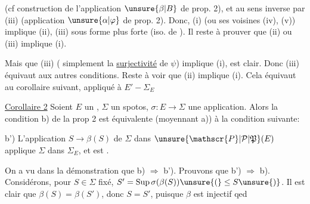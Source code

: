 
(cf construction de l'application $\unsure{\beta|B}$ de prop. 2), et au sens inverse par (iii) (application $\unsure{\alpha|\varphi}$ de prop. 2). Donc, (i) (ou ses voisines (iv), (v)) implique (ii), (iii) sous forme plus forte (iso. de ). Il reste à prouver que (ii) ou (iii) implique  (i).

Mais que (iii) ( simplement la \uline{surjectivité} de $\psi$) implique (i), est clair. Donc (iii) équivaut aux autres conditions. Reste à voir que (ii) implique (i). Cela équivaut au corollaire suivant, appliqué à $E'\mathbin{-}\Sigma_E$

\uline{Corollaire 2} Soient $E$ un , $\Sigma$ un spotos, $\sigma:E\longrightarrow\Sigma$ une application. Alors la condition b) de la prop 2 est équivalente (moyennant a)) à la condition suivante:

b') L'application $S\longrightarrow\beta(S)$ de $\Sigma$ dans $\unsure{\mathscr{P}|\mathcal{P}|\mathfrak{P}}(E)$ applique $\Sigma$ dans $\Sigma_E$, et est .

On a vu dans la démonstration que b) $\Longrightarrow$ b'). Prouvons que b') $\Longrightarrow$ b). Considérons, pour $S\in\Sigma$ fixé, $S'=\operatorname{Sup}\sigma(\beta(S))\unsure{(}\leq S\unsure{)}$. Il est clair que $\beta(S)=\beta(S')$, donc $S=S'$, puisque $\beta$ est injectif qed
